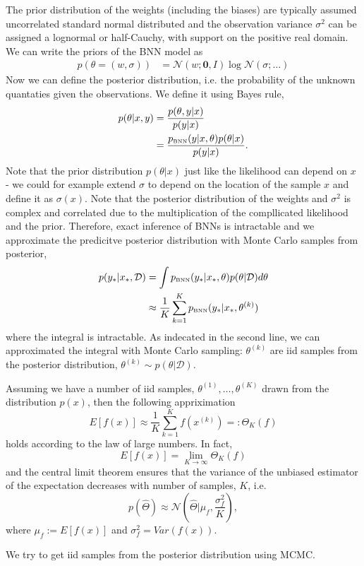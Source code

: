 The prior distribution of the weights (including the biases) are typically assumed uncorrelated
standard normal distributed and the observation variance $\sigma^2$ can be assigned a lognormal or
half-Cauchy, with support on the positive real domain. We can write the priors of the BNN model as
\begin{align*}
    p(\theta = (w, \sigma)) &= \mathcal{N}(w;\textbf{0},I) \log\mathcal{N}(\sigma;\dots)
\end{align*}
Now we can define the posterior distribution, i.e. the probability of the unknown quantaties given
the observations. We define it using Bayes rule, 
\begin{align*}
    p(\theta|x,y) &= \frac{p(\theta,y|x)}{p(y|x)}\\
    &=\frac{p_{\text{\tiny BNN}}(y|x, \theta)p(\theta|x)}{p(y|x)}.
\end{align*}
Note that the prior distribution $p(\theta|x)$ just like the likelihood can depend on $x$ - we could
for example extend $\sigma$ to depend on the location of the sample $x$ and define it as
$\sigma(x)$. Note that the posterior distribution of the weights and $\sigma^2$ is
complex and correlated due to the multiplication of the compllicated likelihood and the prior. 
Therefore, exact inference of BNNs is intractable and we approximate the predicitve posterior distribution 
with Monte Carlo samples from posterior, 
\begin{align*}
    p(y_*|x_*,\mathcal{D}) &= \int p_{\text{\tiny BNN}}(y_*|x_*, \theta)p(\theta|\mathcal{D})d\theta\\
    &\approx \frac{1}{K} \sum_{k=1}^K p_{\text{\tiny BNN}}(y_*|x_*, \theta^{(k)})
\end{align*}
where the integral is intractable. As indecated in the second line, we can approximated the
integral with Monte Carlo sampling: $\theta^{(k)}$ are iid samples from the posterior distribution,
$\theta^{(k)} \sim p(\theta|\mathcal{D})$. 
\begin{testexample2}
    Assuming we have a number of iid samples, $\theta^{(1)}, \dots, \theta^{(K)}$ drawn from the
    distribution $p(x)$, then the following appriximation $$E[f(x)] \approx \frac{1}{K} \sum_{k=1}^K
    f(x^{(k)}) =: \Theta_{K}(f)$$ holds according to the law of large numbers. In fact,  $$E[f(x)] =
    \lim_{K \rightarrow \infty} \Theta_{K}(f)$$ and the central limit theorem ensures that the
    variance of the unbiased estimator of the expectation decreases with number of samples, $K$, i.e.
    $$p(\hat \Theta)  \approx  \mathcal{N}(\hat \Theta |\mu_f,
    \frac{\sigma_f^2}{K}),$$ where $\mu_f := E[f(x)] $ and $\sigma_f^2 =
    Var(f(x))$. \cite[708]{ML_Bayesian_Pespective}
\end{testexample2}
We try to get iid samples from the posterior distribution using MCMC.

